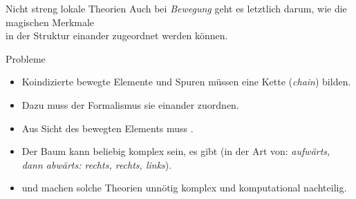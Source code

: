\begin{frame}
  {Nicht streng lokale Theorien}
  \onslide<+->
  \onslide<+->
  Auch bei \textit{Bewegung} geht es letztlich darum, wie die magischen Merkmale\\
  in der Struktur einander zugeordnet werden können.\\
  \onslide<+->
  \Zeile
  \begin{minipage}{0.35\textwidth}
    \centering 
  \end{minipage}\hspace{1em}\onslide<+->\begin{minipage}{0.6\textwidth}
    Probleme\\
    \Halbzeile
    \begin{itemize}[<+->]\small
      \item Koindizierte bewegte Elemente und Spuren müssen eine Kette (\textit{chain}) bilden.
      \item Dazu muss der Formalismus sie einander zuordnen.
      \item Aus Sicht des bewegten Elements muss .
      \item Der Baum kann beliebig komplex sein, es gibt  (in der Art von: \textit{aufwärts, dann abwärts: rechts, rechts, links}).
      \item {} und  machen solche Theorien unnötig komplex und komputational nachteilig.
    \end{itemize}
  \end{minipage}
\end{frame}

